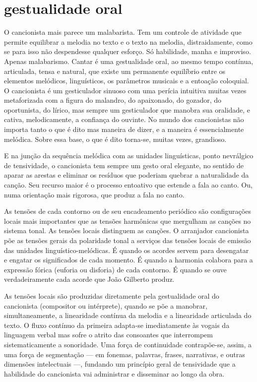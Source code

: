 \section{gestualidade oral}

O cancionista mais parece um malabarista. Tem um controle de atividade
que permite equilibrar a melodia no texto e o texto na melodia,
distraidamente, como se para isso não despendesse qualquer esforço. Só
habilidade, manha e improviso. Apenas malabarismo. Cantar é uma
gestualidade oral, ao mesmo tempo contínua, articulada, tensa e natural,
que existe um permanente equilíbrio entre os elementos melódicos,
linguísticos, os parâmetros musicais e a entoação coloquial. O
cancionista é um gesticulador sinuoso com uma perícia intuitiva muitas
vezes metaforizada com a figura do malandro, do apaixonado, do gozador,
do oportunista, do lírico, mas sempre um gesticulador que manobra sua
oralidade, e cativa, melodicamente, a confiança do ouvinte. No mundo dos
cancionistas não importa tanto o que é dito mas maneira de dizer, e a
maneira é essencialmente melódica. Sobre essa base, o que é dito
torna-se, muitas vezes, grandioso.

E na junção da sequência melódica com as unidades linguísticas, ponto
nevrálgico de tensividade, o cancionista tem sempre um gesto oral
elegante, no sentido de aparar as arestas e eliminar os resíduos que
poderiam quebrar a naturalidade da canção. Seu recurso maior é o
processo entoativo que estende a fala ao canto. Ou, numa orientação mais
rigorosa, que produz a fala no canto.

As tensões de cada contorno ou de seu encadeamento periódico são
configurações locais mais importantes que as tensões harmônicas que
mergulham as canções no sistema tonal. As tensões locais distinguem as
canções. O arranjador cancionista põe as tensões gerais da polaridade
tonal a serviços das tensões locais de emissão das unidades
linguístico-melódicas. É quando os acordes servem para desengatar e
engatar os significados de cada momento. É quando a harmonia colabora
para a expressão fórica (euforia ou disforia) de cada contorno. É quando
se ouve verdadeiramente cada acorde que João Gilberto produz.

As tensões locais são produzidas diretamente pela gestualidade oral do
cancionista (compositor ou intérprete), quando se põe a manobrar,
simultaneamente, a linearidade contínua da melodia e a linearidade
articulada do texto. O fluxo contínuo da primeira adapta-se
imediatamente às vogais da linguagem verbal mas sofre o atrito das
consoantes que interrompem sistematicamente a sonoridade. Uma força de
continuidade contrapõe-se, assim, a uma força de segmentação --- em
fonemas, palavras, frases, narrativas, e outras dimensões intelectuais ---,
fundando um princípio geral de tensividade que a habilidade do
cancionista vai administrar e disseminar ao longo da obra.

